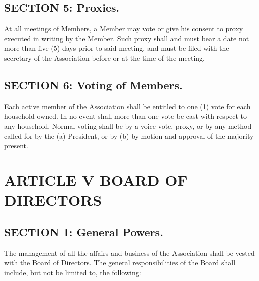 \subsection{SECTION 5: Proxies.}
At all meetings of Members, a Member may vote or give his consent to proxy
executed in writing by the Member. Such proxy shall and must bear a date
not more than five (5) days prior to said meeting, and must be filed with
the secretary of the Association before or at the time of the meeting.

\subsection{SECTION 6: Voting of Members.}
Each active member of the Association shall be entitled to one (1) vote
for each household owned. In no event shall more than one vote be cast
with respect to any household. Normal voting shall be by a voice vote,
proxy, or by any method called for by the (a) President, or by (b)
by motion and approval of the majority present.

\section{ARTICLE V BOARD OF DIRECTORS}

\subsection{SECTION 1: General Powers.}
The management of all the affairs and business of the Association shall
be vested with the Board of Directors. The general responsibilities of
the Board shall include, but not be limited to, the following:

